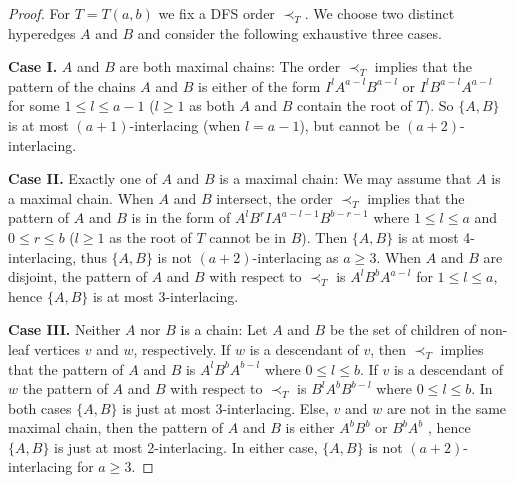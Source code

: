\documentclass[10pt,a4paper]{amsart}
\begin{document}
\begin{proof}
For $T=T(a,b)$ we fix a DFS order $\prec_T$. We choose two distinct hyperedges $A$ and $B$ and consider the following exhaustive three cases. 

\smallskip

\textbf{Case I.} $A$ and $B$ are both maximal chains: The order $\prec_T$ implies that the pattern of the chains $A$ and $B$ is either of the form $I^lA^{a-l}B^{a-l}$ or $I^lB^{a-l}A^{a-l}$ for some $1\leq l \leq a-1$ ($l\ge 1$ as both $A$ and $B$ contain the root of $T$). So $\{A, B\}$ is at most $(a+1)$-interlacing (when $l=a-1$), but cannot be $(a+2)$-interlacing.

\smallskip 

\textbf{Case II.} Exactly one of $A$ and $B$ is a maximal chain: We may assume that $A$ is a maximal chain. When $A$ and $B$ intersect, the order $\prec_T$ implies that the pattern of $A$ and $B$ is in the form of $A^lB^rIA^{a-l-1}B^{b-r-1}$ where $1\leq l \leq a$ and $0 \leq r \leq b$ ($l\geq 1$ as the root of $T$ cannot be in $B$). Then $\{A,B\}$ is at most 4-interlacing, thus $\{A,B\}$ is not $(a+2)$-interlacing as $a \geq 3$. When $A$ and $B$ are disjoint, the pattern of $A$ and $B$ with respect to $\prec_T$ is $A^lB^bA^{a-l}$ for $1\leq l \leq a$,
hence $\{A,B\}$ is at most 3-interlacing.

\smallskip
		
\textbf{Case III.} Neither $A$ nor $B$ is a chain: Let $A$ and $B$ be the set of children of non-leaf vertices $v$ and $w$, respectively. 
If $w$ is a descendant of $v$, then $\prec_T$ implies that the pattern of $A$ and $B$ is $A^lB^bA^{b-l}$  where $0\leq l \leq b$. 
If $v$ is a descendant of $w$ the pattern of $A$ and $B$ with respect to $\prec_T$ is $B^lA^bB^{b-l}$ where $0\leq l \leq b$. In both cases $\{A,B\}$ is just at most 3-interlacing. Else, $v$ and $w$ are not in the same maximal chain, then the pattern of $A$ and $B$ is either $A^bB^b$ or $B^bA^b$ , hence $\{A,B\}$ is just at most 2-interlacing. In either case, $\{A,B\}$ is not $(a+2)$-interlacing for $a\geq 3$.
\end{proof}
\end{document}
